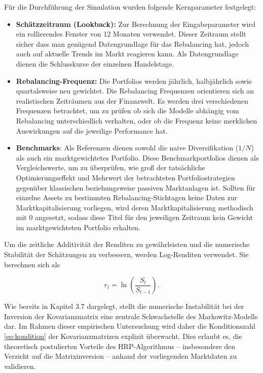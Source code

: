 \documentclass[parskip=half]{scrartcl}
\begin{document}
	Für die Durchführung der Simulation wurden folgende Kernparameter festgelegt:
	
	\begin{itemize}
		\item \textbf{Schätzzeitraum (Lookback):} Zur Berechnung der Eingabeparameter wird ein rollierendes Fenster von 12 Monaten verwendet. Dieser Zeitraum stellt sicher dass man genügend Datengrundlage für das Rebalancing hat, jedoch auch auf aktuelle Trends im Markt reagieren kann. Als Datengrundlage dienen die Schlusskurse der einzelnen Handelstage.
		\item \textbf{Rebalancing-Frequenz:} Die Portfolios werden jährlich, halbjährlich sowie quartalsweise neu gewichtet. Die Rebalancing Frequenzen orientieren sich an realistischen Zeiträumen aus der Finanzwelt. Es werden drei verschiedenen Frequenzen betrachtet, um zu prüfen ob sich die Modelle abhängig vom Rebalancing unterschiedlich verhalten, oder ob die Frequenz keine merklichen Auswirkungen auf die jeweilige Performance hat.
		\item \textbf{Benchmarks}: Als Referenzen dienen sowohl die naive Diversifikation ($1/N$) als auch ein marktgewichtetes Portfolio. Diese Benchmarkportfolios dienen als Vergleichswerte, um zu überprüfen, wie groß der tatsächliche Optimierungseffekt und Mehrwert der betrachteten Portfoliostrategien gegenüber klassischen beziehungsweise passiven Marktanlagen ist. Sollten für einzelne Assets zu bestimmten Rebalancing-Stichtagen keine Daten zur Marktkapitalisierung vorliegen, wird deren Marktkapitalisierung methodisch mit 0 angesetzt, sodass diese Titel für den jeweiligen Zeitraum kein Gewicht im marktgewichteten Portfolio erhalten. 
	\end{itemize}
	
	
	Um die zeitliche Additivität der Renditen zu gewährleisten und die numerische Stabilität der Schätzungen zu verbessern, werden Log-Renditen verwendet. Sie berechnen sich als
	
	\begin{equation}
		r_{t} = \ln \left( \frac{S_t}{S_{t-1}} \right) . \label{eq:log_returns}
	\end{equation}
	
	
	
	Wie bereits in Kapitel 3.7 dargelegt, stellt die numerische Instabilität bei der Inversion der Kovarianzmatrix eine zentrale Schwachstelle des Markowitz-Modells dar. Im Rahmen dieser empirischen Untersuchung wird daher die Konditionszahl \eqref{eq:kondition} der Kovarianzmatrizen explizit überwacht. Dies erlaubt es, die theoretisch postulierten Vorteile des HRP-Algorithmus – insbesondere den Verzicht auf die Matrixinversion – anhand der vorliegenden Marktdaten zu validieren.
	
\end{document}
